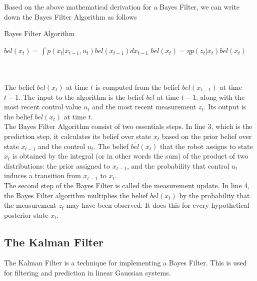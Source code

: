 \documentclass[conference]{IEEEtran}
\begin{document}
Based on the above mathematical derivation for a Bayes Filter, we can write down the Bayes Filter Algorithm as follows

\begin{minipage}{\linewidth}
  \begin{algorithm}[H]
    \caption{Bayes Filter Algorithm}\label{AlgBayes}
    \begin{algorithmic}[1]
		\State $\overline{bel}(x_t) = \int p(x_t|x_{t-1}, u_t) bel(x_{t-1}) dx_{t-1}$
		\State $bel(x_t)= \eta p(z_t|x_t) \overline{bel}(x_t)$
	\EndFor
      \EndProcedure
    \end{algorithmic}
  \end{algorithm}
\end{minipage}\\\\

The belief $bel(x_t)$ at time $t$ is computed from the belief $bel(x_{t-1})$ at time $t-1$. The input to the algorithm is the belief $bel$ at time $t-1$, along with the most recent control value $u_t$ and the most recent measurement $z_t$. Its output is the belief $bel(x_t)$ at time $t$.\\

The Bayes Filter Algorithm consist of two essentials steps. In line 3, which is the prediction step, it calculates its belief over state $x_t$ based on the prior belief over state $x_{t-1}$ and the control $u_t$. The belief $\overline{bel}(x_t)$ that the robot assigns to state $x_t$ is obtained by the integral (or in other words the sum) of the product of two distributions: the prior assigned to $x_{t-1}$, and the probability that control $u_t$ induces a transition from $x_{t-1}$ to $x_t$.\\

The second step of the Bayes Filter is called the measurement update. In line 4, the Bayes Filter algorithm multiplies the belief $\overline{bel}(x_t)$ by the probability that the measurement $z_t$ may have been observed. It does this for every hypothetical posterior state $x_t$.

\subsection{The Kalman Filter}

The Kalman Filter is a technique for implementing a Bayes Filter\cite{thrun}. This is used for filtering and prediction in linear Gaussian systems.\\
\end{document}
